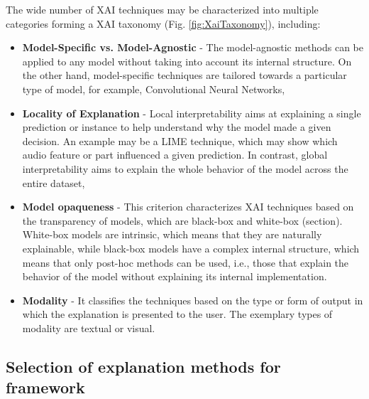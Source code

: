 \documentclass[
    bindingoffset=5mm,  %
    footnoteindent=3mm, %
    hyphenation=true    %
]{src/wut-thesis}
\begin{document}
The wide number of XAI techniques may be characterized into multiple categories forming
a XAI taxonomy (Fig. \ref{fig:XaiTaxonomy}), including:
\begin{itemize} [itemsep=1\baselineskip]
    \item \textbf{Model-Specific vs. Model-Agnostic} - The model-agnostic methods can be applied to
        any model without taking into account its internal structure. On the other hand, model-specific
        techniques are tailored towards a particular type of model, for example, Convolutional Neural Networks,
    \item \textbf{Locality of Explanation} - Local interpretability aims at explaining a single prediction
        or instance to help understand why the model made a given decision. An example may be a LIME technique,
        which may show which audio feature or part influenced a given prediction. In contrast, global
        interpretability aims to explain the whole behavior of the model across the entire dataset,
    \item \textbf{Model opaqueness} - This criterion characterizes XAI techniques based on the transparency
        of models, which are black-box and white-box (section). White-box models are intrinsic, which means that
        they are naturally explainable, while black-box models have a complex internal structure, which means
        that only post-hoc methods can be used, i.e., those that explain the behavior of the model
        without explaining its internal implementation.
    \item \textbf{Modality} - It classifies the techniques based on the type or form of output
        in which the explanation is presented to the user. The exemplary types of modality
        are textual or visual.
\end{itemize}

\subsection{Selection of explanation methods for framework}
\end{document}
